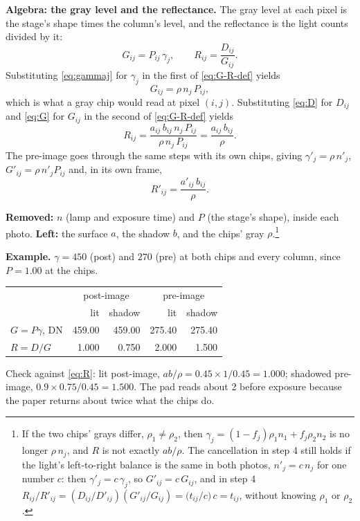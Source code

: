 \documentclass[11pt,letter]{article}
\begin{document}
\textbf{Algebra: the gray level and the reflectance.}  The gray level
at each pixel is the stage's shape times the column's level, and the
reflectance is the light counts divided by it:
\begin{equation}
  G_{ij} = P_{ij}\, \gamma_j , \qquad
  R_{ij} = \frac{D_{ij}}{G_{ij}} .
  \label{eq:G-R-def}
\end{equation}
Substituting \eqref{eq:gammaj} for $\gamma_j$ in the first of
\eqref{eq:G-R-def} yields
\begin{equation}
  G_{ij} = \rho\, n_j\, P_{ij} ,
  \label{eq:G}
\end{equation}
which is what a gray chip would read at pixel $(i, j)$.  Substituting
\eqref{eq:D} for $D_{ij}$ and \eqref{eq:G} for $G_{ij}$ in the second of
\eqref{eq:G-R-def} yields
\begin{equation}
  R_{ij} = \frac{a_{ij}\, b_{ij}\, n_j\, P_{ij}}{\rho\, n_j\, P_{ij}}
         = \frac{a_{ij}\, b_{ij}}{\rho} .
  \label{eq:R}
\end{equation}
The pre-image goes through the same steps with its own chips, giving
$\gamma'_j = \rho\, n'_j$, $G'_{ij} = \rho\, n'_j P_{ij}$ and, in its own
frame,
\begin{equation}
  R'_{ij} = \frac{a'_{ij}\, b_{ij}}{\rho} .
  \label{eq:Rpre}
\end{equation}

\textbf{Removed:} $n$ (lamp and exposure time) and $P$ (the stage's shape),
inside each photo.  \textbf{Left:} the surface $a$, the shadow $b$, and
the chips' gray $\rho$.\footnote{If the two chips' grays differ, $\rho_1
\ne \rho_2$, then $\gamma_j = (1 - f_j)\rho_1 n_1 + f_j \rho_2 n_2$ is no
longer $\rho\, n_j$, and $R$ is not exactly $a b / \rho$.  The
cancellation in step 4 still holds if the light's left-to-right balance is
the same in both photos, $n'_j = c\, n_j$ for one number $c$: then
$\gamma'_j = c\, \gamma_j$, so $G'_{ij} = c\, G_{ij}$, and in step 4
$R_{ij}/R'_{ij} = (D_{ij}/D'_{ij})(G'_{ij}/G_{ij})
= \bigl(t_{ij}/c\bigr)\, c = t_{ij}$, without knowing $\rho_1$ or
$\rho_2$.}

\textbf{Example.}  $\gamma = 450$ (post) and $270$ (pre) at both chips and
every column, since $P = 1.00$ at the chips.

\medskip
\begin{center}
\begin{tabular}{@{}lrrrr@{}}
\toprule
 & \multicolumn{2}{c}{post-image} & \multicolumn{2}{c}{pre-image} \\
 & lit & shadow & lit & shadow \\
\midrule
$G = P\gamma$, DN & 459.00 & 459.00 & 275.40 & 275.40 \\
$R = D/G$         & 1.000  & 0.750  & 2.000  & 1.500 \\
\bottomrule
\end{tabular}
\end{center}
\noindent Check against \eqref{eq:R}: lit post-image,
$a b/\rho = 0.45 \times 1 / 0.45 = 1.000$; shadowed pre-image,
$0.9 \times 0.75 / 0.45 = 1.500$.  The pad reads about 2 before exposure
because the paper returns about twice what the chips do.
\end{document}
